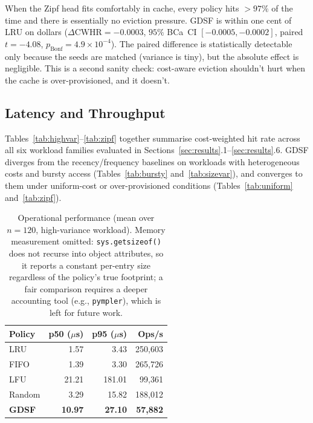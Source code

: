 \documentclass[sigconf, nonacm, review=false, screen=true]{acmart}
\begin{document}
When the Zipf head fits comfortably in cache, every policy hits $>97\%$
of the time and there is essentially no eviction pressure. GDSF is within
one cent of LRU on dollars ($\Delta\text{CWHR} = -0.0003$, $95\%$
BCa~CI $[-0.0005, -0.0002]$, paired~$t = -4.08$, $p_{\text{Bonf}} =
4.9\!\times\!10^{-4}$). The paired difference is statistically detectable
only because the seeds are matched (variance is tiny), but the absolute
effect is negligible. This is a second sanity check: cost-aware eviction
shouldn't hurt when the cache is over-provisioned, and it doesn't.

\subsection{Latency and Throughput}

Tables~\ref{tab:highvar}--\ref{tab:zipf} together summarise cost-weighted
hit rate across all six workload families evaluated in
Sections~\ref{sec:results}.1--\ref{sec:results}.6. GDSF diverges from
the recency/frequency baselines on workloads with heterogeneous costs
and bursty access (Tables~\ref{tab:bursty} and~\ref{tab:sizevar}),
and converges to them under uniform-cost or over-provisioned
conditions (Tables~\ref{tab:uniform} and~\ref{tab:zipf}).

\begin{table}[t]
  \centering
  \caption{Operational performance (mean over $n=120$, high-variance workload).
           Memory measurement omitted: \texttt{sys.getsizeof()} does not
           recurse into object attributes, so it reports a constant
           per-entry size regardless of the policy's true footprint;
           a fair comparison requires a deeper accounting tool
           (e.g., \texttt{pympler}), which is left for future work.}
  \label{tab:latency}
  \small
  \begin{tabular}{lrrr}
    \toprule
    Policy  & p50 ($\mu$s) & p95 ($\mu$s) & Ops/s \\
    \midrule
    LRU     & 1.57  & 3.43   & 250{,}603 \\
    FIFO    & 1.39  & 3.30   & 265{,}726 \\
    LFU     & 21.21 & 181.01 &  99{,}361 \\
    Random  & 3.29  & 15.82  & 188{,}012 \\
    \textbf{GDSF} & \textbf{10.97} & \textbf{27.10} & \textbf{57{,}882} \\
    \bottomrule
  \end{tabular}
\end{table}
\end{document}

